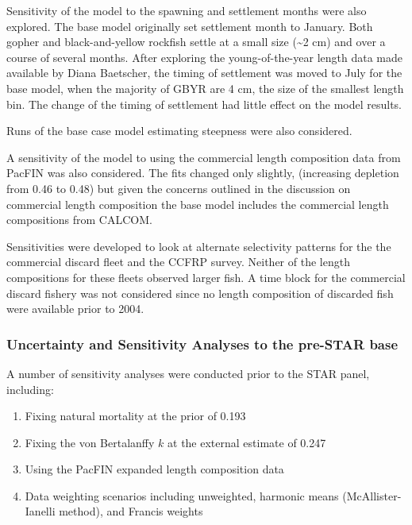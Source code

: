 \documentclass[12pt,]{article}
\begin{document}
Sensitivity of the model to the spawning and settlement months were also
explored. The base model originally set settlement month to January.
Both gopher and black-and-yellow rockfish settle at a small size
(\textasciitilde{}2 cm) and over a course of several months. After
exploring the young-of-the-year length data made available by Diana
Baetscher, the timing of settlement was moved to July for the base
model, when the majority of GBYR are 4 cm, the size of the smallest
length bin. The change of the timing of settlement had little effect on
the model results.

Runs of the base case model estimating steepness were also considered.

A sensitivity of the model to using the commercial length composition
data from PacFIN was also considered. The fits changed only slightly,
(increasing depletion from 0.46 to 0.48) but given the concerns outlined
in the discussion on commercial length composition the base model
includes the commercial length compositions from CALCOM.

Sensitivities were developed to look at alternate selectivity patterns
for the the commercial discard fleet and the CCFRP survey. Neither of
the length compositions for these fleets observed larger fish. A time
block for the commercial discard fishery was not considered since no
length composition of discarded fish were available prior to 2004.

\subsubsection{Uncertainty and Sensitivity Analyses to the pre-STAR
base}\label{uncertainty-and-sensitivity-analyses-to-the-pre-star-base}

A number of sensitivity analyses were conducted prior to the STAR panel,
including:

\begin{enumerate}

  \item Fixing natural mortality at the prior of 0.193
  
  \item Fixing the von Bertalanffy $k$ at the external estimate of 0.247
  
  \item Using the PacFIN expanded length composition data
  
  \item Data weighting scenarios including unweighted, harmonic means (McAllister-Ianelli method), and Francis weights

\end{enumerate}
\end{document}
